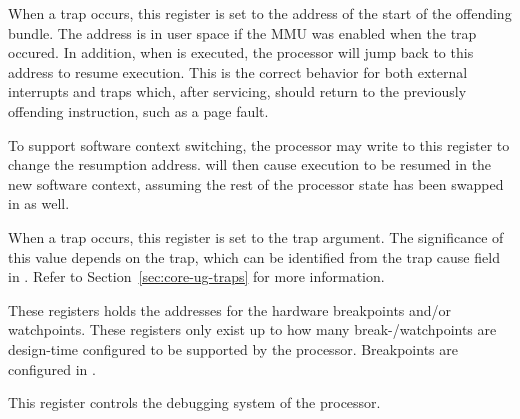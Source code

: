 \debugCanWrite{}
\coreCanWrite{}


When a trap occurs, this register is set to the address of the start of the
offending bundle. The address is in user space if the MMU was enabled when the
trap occured. In addition, when  is executed, the processor will jump
back to this address to resume execution. This is the correct behavior for both
external interrupts and traps which, after servicing, should return to the
previously offending instruction, such as a page fault.

To support software context switching, the processor may write to this register
to change the resumption address.  will then cause execution to be
resumed in the new software context, assuming the rest of the processor state
has been swapped in as well.

\debugCanWrite{}
\coreCanWrite{}


When a trap occurs, this register is set to the trap argument. The significance
of this value depends on the trap, which can be identified from the trap cause
field in . Refer to Section~\ref{sec:core-ug-traps} for more
information.

\debugCanWrite{}


These registers holds the addresses for the hardware breakpoints and/or
watchpoints. These registers only exist up to how many break-/watchpoints are
design-time configured to be supported by the processor. Breakpoints are
configured in .

\debugCanWrite{}
\coreCanWrite{}


This register controls the debugging system of the \rvex{} processor.

\debugCanWrite{}

